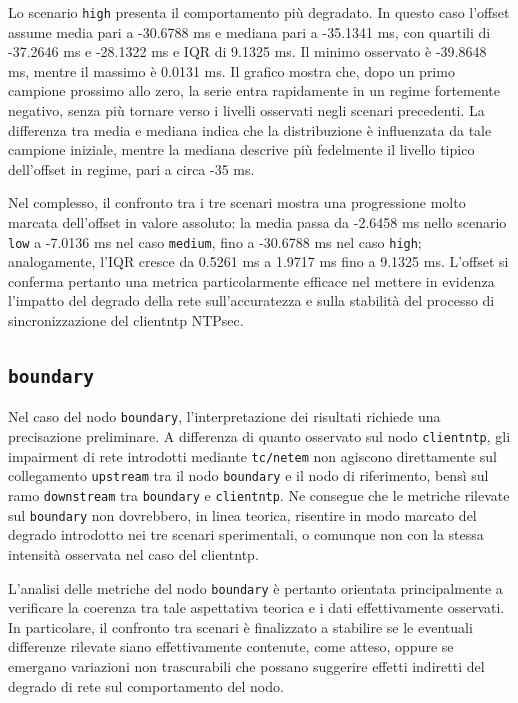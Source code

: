 Lo scenario \texttt{high} presenta il comportamento più degradato. In questo
caso l’offset assume media pari a -30.6788 ms e mediana pari a -35.1341 ms, con quartili
di -37.2646 ms e -28.1322 ms e IQR di 9.1325 ms. Il minimo osservato è -39.8648 ms,
mentre il massimo è 0.0131 ms. Il grafico mostra che, dopo un primo campione
prossimo allo zero, la serie entra rapidamente in un regime fortemente negativo,
senza più tornare verso i livelli osservati negli scenari precedenti. La differenza
tra media e mediana indica che la distribuzione è influenzata da tale campione iniziale,
mentre la mediana descrive più fedelmente il livello tipico dell’offset in
regime, pari a circa -35 ms.

Nel complesso, il confronto tra i tre scenari mostra una progressione molto marcata
dell’offset in valore assoluto: la media passa da -2.6458 ms nello scenario \texttt{low}
a -7.0136 ms nel caso \texttt{medium}, fino a -30.6788 ms nel caso \texttt{high};
analogamente, l’IQR cresce da 0.5261 ms a 1.9717 ms fino a 9.1325 ms. L’offset
si conferma pertanto una metrica particolarmente efficace nel mettere in
evidenza l’impatto del degrado della rete sull’accuratezza e sulla stabilità del
processo di sincronizzazione del clientntp NTPsec.

\subsection{\texttt{boundary}}
Nel caso del nodo \texttt{boundary}, l’interpretazione dei risultati richiede
una precisazione preliminare. A differenza di quanto osservato sul nodo \texttt{clientntp},
gli impairment di rete introdotti mediante \texttt{tc/netem} non agiscono
direttamente sul collegamento \texttt{upstream} tra il nodo \texttt{boundary} e
il nodo di riferimento, bensì sul ramo \texttt{downstream} tra \texttt{boundary} e
\texttt{clientntp}. Ne consegue che le metriche rilevate sul \texttt{boundary}
non dovrebbero, in linea teorica, risentire in modo marcato del degrado
introdotto nei tre scenari sperimentali, o comunque non con la stessa intensità osservata
nel caso del clientntp.

L’analisi delle metriche del nodo \texttt{boundary} è pertanto orientata
principalmente a verificare la coerenza tra tale aspettativa teorica e i dati
effettivamente osservati. In particolare, il confronto tra scenari è finalizzato
a stabilire se le eventuali differenze rilevate siano effettivamente contenute, come
atteso, oppure se emergano variazioni non trascurabili che possano suggerire
effetti indiretti del degrado di rete sul comportamento del nodo.

